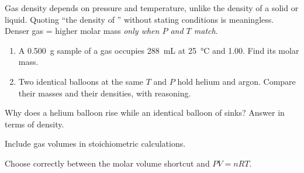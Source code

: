 \documentclass{apchem-notes}
\begin{document}
\begin{apctrap}
Gas density depends on pressure and temperature, unlike the density of a
solid or liquid. Quoting ``the density of '' without stating
conditions is meaningless. Denser gas = higher molar mass \emph{only when
$P$ and $T$ match}.
\end{apctrap}


\begin{enumerate}[leftmargin=*,itemsep=0.4em]
  \item A \SI{0.500}{\gram} sample of a gas occupies \SI{288}{\milli\liter}
        at \SI{25}{\celsius} and \SI{1.00}{\atm}. Find its molar mass.
        \workspace[2.6cm]
  \item Two identical balloons at the same $T$ and $P$ hold helium and
        argon. Compare their masses and their densities, with reasoning.
\end{enumerate}

\begin{exitticket}
Why does a helium balloon rise while an identical balloon of  sinks?
Answer in terms of density. 
\end{exitticket}


\begin{objectives}
  \item Include gas volumes in stoichiometric calculations.
  \item Choose correctly between the molar volume shortcut and $PV = nRT$.
\end{objectives}

\end{document}
